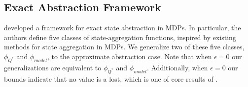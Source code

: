 \subsection{Exact Abstraction Framework}

\citeauthor*{li2006towards} developed a framework for exact state abstraction in \acp{MDP}. In particular, the authors define five classes of state-aggregation functions, inspired by existing methods for state aggregation in \acp{MDP}. We generalize two of these five classes, $\phi_{Q^*}$ and $\phi_{model}$, to the approximate abstraction case. Note that when $\epsilon=0$ our generalizations are equivalent to $\phi_{Q^*}$ and $\phi_{model}$. Additionally, when $\epsilon=0$ our bounds indicate that no value is a lost, which is one of core results of \citeauthor{li2006towards}.


